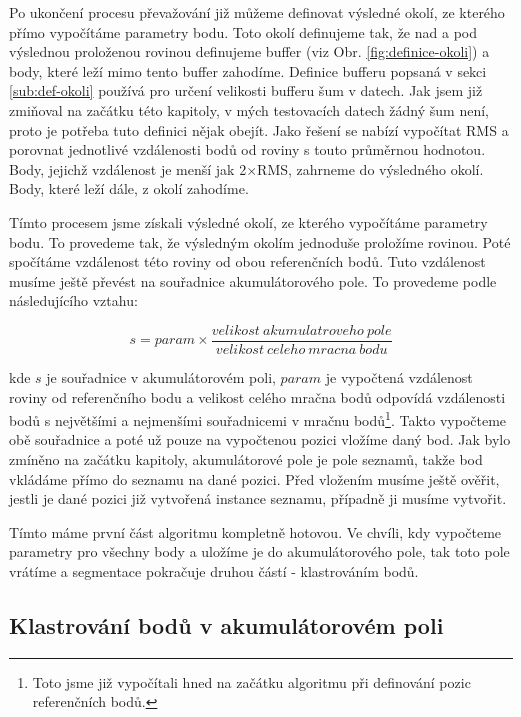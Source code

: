 \documentclass[11pt,twoside,a4paper]{book}
\begin{document}
Po ukončení procesu převažování již můžeme definovat výsledné okolí, ze kterého přímo vypočítáme parametry bodu. Toto okolí definujeme tak, že nad a pod výslednou proloženou rovinou definujeme buffer (viz Obr. \ref{fig:definice-okoli}) a body, které leží mimo tento buffer zahodíme. Definice bufferu popsaná v sekci \ref{sub:def-okoli} používá pro určení velikosti bufferu šum v datech. Jak jsem již zmiňoval na začátku této kapitoly, v mých testovacích datech žádný šum není, proto je potřeba tuto definici nějak obejít. Jako řešení se nabízí vypočítat RMS a porovnat jednotlivé vzdálenosti bodů od roviny s touto průměrnou hodnotou. Body, jejichž vzdálenost je menší jak 2$\times$RMS, zahrneme do výsledného okolí. Body, které leží dále, z okolí zahodíme. 

Tímto procesem jsme získali výsledné okolí, ze kterého vypočítáme parametry bodu. To provedeme tak, že výsledným okolím jednoduše proložíme rovinou. Poté spočítáme vzdálenost této roviny od obou referenčních bodů. Tuto vzdálenost musíme ještě převést na souřadnice akumulátorového pole. To provedeme podle následujícího vztahu:

\begin{equation}
s = param \times \frac{velikost~akumulatroveho~pole}{velikost~celeho~mracna~bodu}
\end{equation}

\noindent
kde $s$ je souřadnice v akumulátorovém poli, $param$ je vypočtená vzdálenost roviny od referenčního bodu a velikost celého mračna bodů odpovídá vzdálenosti bodů s největšími a nejmenšími souřadnicemi v mračnu bodů\footnote{Toto jsme již vypočítali hned na začátku algoritmu při definování pozic referenčních bodů.}. Takto vypočteme obě souřadnice a poté už pouze na vypočtenou pozici vložíme daný bod. Jak bylo zmíněno na začátku kapitoly, akumulátorové pole je pole seznamů, takže bod vkládáme přímo do seznamu na dané pozici. Před vložením musíme ještě ověřit, jestli je dané pozici již vytvořená instance seznamu, případně ji musíme vytvořit.

Tímto máme první část algoritmu kompletně hotovou. Ve chvíli, kdy vypočteme parametry pro všechny body a uložíme je do akumulátorového pole, tak toto pole vrátíme a segmentace pokračuje druhou částí - klastrováním bodů.


\subsection{Klastrování bodů v akumulátorovém poli}
\label{sub:seg1-klastrovani}
\end{document}
